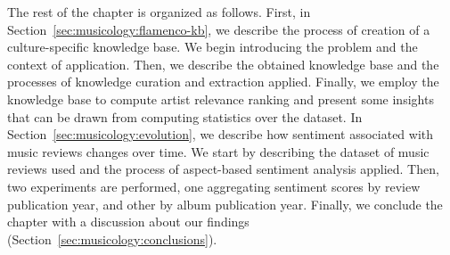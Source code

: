 
The rest of the chapter is organized as follows. First, in Section~\ref{sec:musicology:flamenco-kb}, we describe the process of creation of a culture-specific knowledge base. We begin introducing the problem and the context of application. Then, we describe the obtained knowledge base and the processes of knowledge curation and extraction applied. Finally, we employ the knowledge base to compute artist relevance ranking and present some insights that can be drawn from computing statistics over the dataset. In Section~\ref{sec:musicology:evolution}, we describe how sentiment associated with music reviews changes over time. We start by describing the dataset of music reviews used and the process of aspect-based sentiment analysis applied. Then, two experiments are performed, one aggregating sentiment scores by review publication year, and other by album publication year. Finally, we conclude the chapter with a discussion about our findings (Section~\ref{sec:musicology:conclusions}). 


